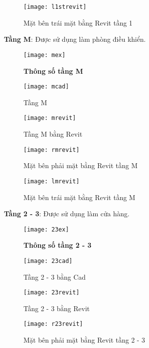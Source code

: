 \begin{figure}[H]
	\centering
	\texttt{[image: l1strevit]}
	\caption{Mặt bên trái mặt bằng Revit tầng 1}
	\label{l1strevit}
\end{figure}

\newpage
\textbf{Tầng M}: Được sử dụng làm phòng điều khiển.
\begin{figure}[H]
	\centering
	\texttt{[image: mex]}
	\caption{\textbf{Thông số tầng M}}
	\label{mex}
\end{figure}

\begin{figure}[H]
  \centering
  \texttt{[image: mcad]}
  \caption{Tầng M}
  \label{mcad}
\end{figure}

\begin{figure}[H]
  \centering
  \texttt{[image: mrevit]}
  \caption{Tầng M bằng Revit}
  \label{mrevit}
\end{figure} 

\begin{figure}[H]
	\centering
	\texttt{[image: rmrevit]}
	\caption{Mặt bên phải mặt bằng Revit tầng M}
	\label{mrevit}
\end{figure} 

\begin{figure}[H]
	\centering
	\texttt{[image: lmrevit]}
	\caption{Mặt bên trái mặt bằng Revit tầng M}
	\label{lrevit}
\end{figure} 

\newpage
\textbf{Tầng 2 - 3}: Được sử dụng làm cửa hàng.
\begin{figure}[H]
	\centering
	\texttt{[image: 23ex]}
	\caption{\textbf{Thông số tầng 2 - 3}}
	\label{23ex}
\end{figure}

\begin{figure}[H]
  \centering
  \texttt{[image: 23cad]}
  \caption{Tầng 2 - 3 bằng Cad}
  \label{23cad}
\end{figure}

\begin{figure}[H]
  \centering
  \texttt{[image: 23revit]}
  \caption{Tầng 2 - 3 bằng Revit}
  \label{23revit}
\end{figure} 

\begin{figure}[H]
	\centering
	\texttt{[image: r23revit]}
	\caption{Mặt bên phải mặt bằng Revit tầng 2 - 3}
	\label{23revit}
\end{figure} 

